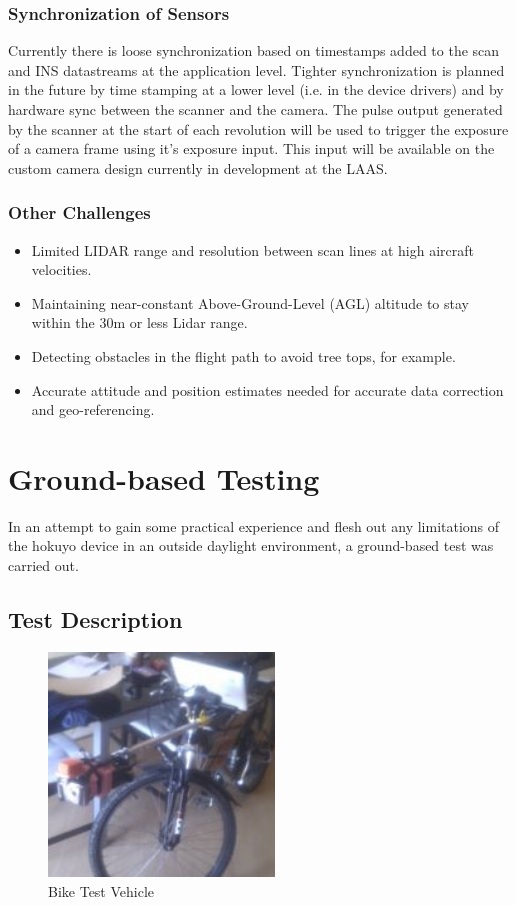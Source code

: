 \documentclass[a4paper,11pt]{report}
\begin{document}
\subsection{Synchronization of Sensors}
 
Currently there is loose synchronization based on timestamps added to the scan and INS datastreams at the application level. Tighter synchronization is planned in the future by time stamping at a lower level (i.e. in the device drivers) and by hardware sync between the scanner and the camera. The pulse output generated by the scanner at the start of each revolution will be used to trigger the exposure of a camera frame using it's exposure input. This input will be available on the custom camera design currently in development at the LAAS.

\subsection{Other Challenges}

\begin{itemize}
 \item Limited LIDAR range and resolution between scan lines at high aircraft velocities.
 \item Maintaining near-constant Above-Ground-Level (AGL) altitude to stay within the 30m or less Lidar range.
 \item Detecting obstacles in the flight path to avoid tree tops, for example.
 \item Accurate attitude and position estimates needed for accurate data correction and geo-referencing.
\end{itemize}

\chapter{Ground-based Testing}

In an attempt to gain some practical experience and flesh out any limitations of the hokuyo device in an outside daylight environment, a ground-based test was carried out.

\section{Test Description}

\begin{figure}[ht]
 \centering
 \includegraphics[width=6cm]{./Bikesciencepackage.jpg}
 \caption{Bike Test Vehicle}
 \label{fig:bike}
\end{figure}
\end{document}
